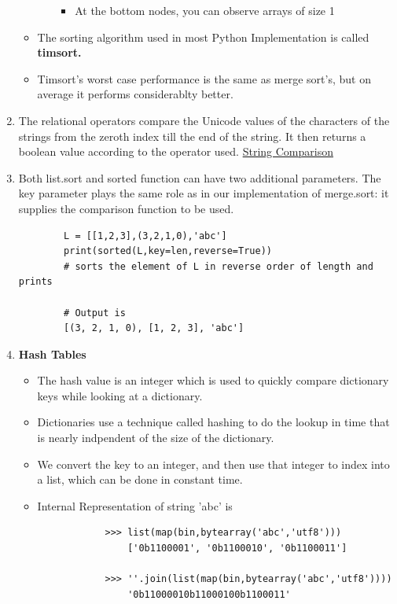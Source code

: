 \documentclass[11pt]{article}
\begin{document}
\begin{enumerate}
\begin{itemize}
\begin{itemize}
\begin{itemize}
                    \item At the bottom nodes, you can observe arrays of size 1
                \end{itemize}
            \end{itemize}
            \item The sorting algorithm used in most Python Implementation is called \textbf{timsort.}
            \item Timsort's worst case performance is the same as merge sort's, but on average it performs considerablty better.
        \end{itemize}
        \item The relational operators compare the Unicode values of the characters of the strings from the zeroth index till the end of the string. It then returns a boolean value according to the operator used. \href{https://www.geeksforgeeks.org/string-comparison-in-python/}{String Comparison}
        \item Both list.sort and sorted function can have two additional parameters. The key parameter plays the same role as in our implementation of merge.sort: it supplies the comparison function to be used.
        \begin{verbatim}
        L = [[1,2,3],(3,2,1,0),'abc']
        print(sorted(L,key=len,reverse=True))
        # sorts the element of L in reverse order of length and prints

        # Output is
        [(3, 2, 1, 0), [1, 2, 3], 'abc']
        \end{verbatim}
        \item \textbf{Hash Tables}
        \begin{itemize}
            \item The hash value is an integer which is used to quickly compare dictionary keys while looking at a dictionary.
            \item Dictionaries use a technique called hashing to do the lookup in time that is nearly indpendent of the size of the dictionary.
            \item We convert the key to an integer, and then use that integer to index into a list, which can be done in constant time.
            \item Internal Representation of string 'abc' is
            \begin{verbatim}
            >>> list(map(bin,bytearray('abc','utf8'))) 
                ['0b1100001', '0b1100010', '0b1100011']

            >>> ''.join(list(map(bin,bytearray('abc','utf8'))))  
                '0b11000010b11000100b1100011'


\end{verbatim}
\end{itemize}
\end{enumerate}
\end{document}

